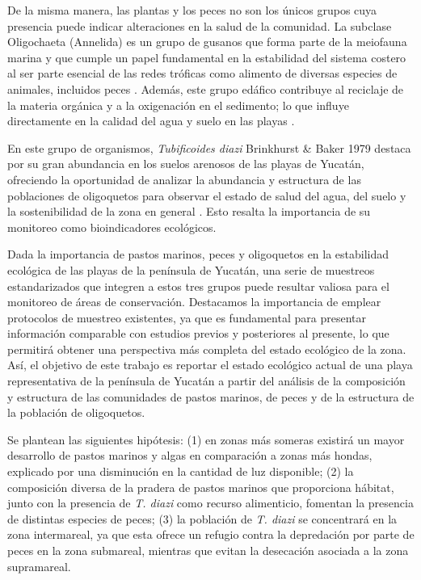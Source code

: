 \documentclass[
  authoryear,
  preprint,
  3p,
  twocolumn]{elsarticle}
\begin{document}
De la misma manera, las plantas y los peces no son los únicos grupos
cuya presencia puede indicar alteraciones en la salud de la comunidad.
La subclase Oligochaeta (Annelida) es un grupo de gusanos que forma
parte de la meiofauna marina y que cumple un papel fundamental en la
estabilidad del sistema costero al ser parte esencial de las redes
tróficas como alimento de diversas especies de animales, incluidos peces
\citep{Diaz1987}. Además, este grupo edáfico contribuye al reciclaje de
la materia orgánica y a la oxigenación en el sedimento; lo que influye
directamente en la calidad del agua y suelo en las playas
\citep{Giere2006, Verdonschot2001, Collado1999}.

En este grupo de organismos, \emph{Tubificoides diazi} Brinkhurst \&
Baker 1979 destaca por su gran abundancia en los suelos arenosos de las
playas de Yucatán, ofreciendo la oportunidad de analizar la abundancia y
estructura de las poblaciones de oligoquetos para observar el estado de
salud del agua, del suelo y la sostenibilidad de la zona en general
\citep{behrend_takeda_gomes_fernandes_2012}. Esto resalta la importancia
de su monitoreo como bioindicadores ecológicos.

Dada la importancia de pastos marinos, peces y oligoquetos en la
estabilidad ecológica de las playas de la península de Yucatán, una
serie de muestreos estandarizados que integren a estos tres grupos puede
resultar valiosa para el monitoreo de áreas de conservación. Destacamos
la importancia de emplear protocolos de muestreo existentes, ya que es
fundamental para presentar información comparable con estudios previos y
posteriores al presente, lo que permitirá obtener una perspectiva más
completa del estado ecológico de la zona. Así, el objetivo de este
trabajo es reportar el estado ecológico actual de una playa
representativa de la península de Yucatán a partir del análisis de la
composición y estructura de las comunidades de pastos marinos, de peces
y de la estructura de la población de oligoquetos.

Se plantean las siguientes hipótesis: (1) en zonas más someras existirá
un mayor desarrollo de pastos marinos y algas en comparación a zonas más
hondas, explicado por una disminución en la cantidad de luz disponible;
(2) la composición diversa de la pradera de pastos marinos que
proporciona hábitat, junto con la presencia de \emph{T. diazi} como
recurso alimenticio, fomentan la presencia de distintas especies de
peces; (3) la población de \emph{T. diazi} se concentrará en la zona
intermareal, ya que esta ofrece un refugio contra la depredación por
parte de peces en la zona submareal, mientras que evitan la desecación
asociada a la zona supramareal.
\end{document}
